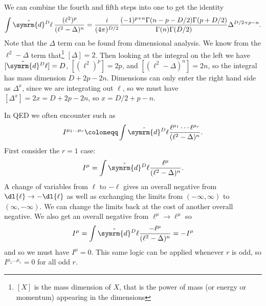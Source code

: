 \documentclass[fleqn]{NotesClass}
\newcommand{\dhat}[1]{\hat{\symrm{d}}{#1}}
\begin{document}
    We can combine the fourth and fifth steps into one to get the identity
    \begin{equation*}
        \int \dhat{^D\ell} \, \frac{(\ell^2)^p}{(\ell^2 - \Delta)^n} = \frac{i}{(4\pi)^{D/2}} \frac{(-1)^{p + n} \Gamma(n - p - D/2)\Gamma(p + D/2)}{\Gamma(n)\Gamma(D/2)} \Delta^{D/2 + p - n}.
    \end{equation*}
    Note that the \(\Delta\) term can be found from dimensional analysis.
    We know from the \(\ell^2 - \Delta\) term that\footnote{\([X]\) is the mass dimension of \(X\), that is the power of mass (or energy or momentum) appearing in the dimensions} \([\Delta] = 2\).
    Then looking at the integral on the left we have \([\dhat{^D\ell}] = D\), \([(\ell^2)^p] = 2p\), and \([(\ell^2 - \Delta)^n] = 2n\), so the integral has mass dimension \(D + 2p - 2n\).
    Dimensions can only enter the right hand side as \(\Delta^x\), since we are integrating out \(\ell\), so we must have \([\Delta^x] = 2x = D + 2p - 2n\), so \(x = D/2 + p - n\).
    
    In QED we often encounter  such as
    \begin{equation}
        I^{\mu_1 \dotso \mu_r} \coloneqq \int \dhat{^D\ell} \frac{\ell^{\mu_1} \dotsm \ell^{\mu_r}}{(\ell^2 - \Delta)^n}.
    \end{equation}
    First consider the \(r = 1\) case:
    \begin{equation}
        I^\mu = \int \dhat{^D\ell} \frac{\ell^\mu}{(\ell^2 - \Delta)^n}.
    \end{equation}
    A change of variables from \(\ell\) to \(-\ell\) gives an overall negative from \(\dl{\ell} \to -\dl{\ell}\) as well as exchanging the limits from \((-\infty, \infty)\) to \((\infty, -\infty)\).
    We can change the limits back at the cost of another overall negative.
    We also get an overall negative from \(\ell^\mu \to \ell^\mu\) so
    \begin{equation}
        I^\mu = \int \dhat{^D\ell} \frac{-\ell^\mu}{(\ell^2 - \Delta)^n} = -I^\mu
    \end{equation}
    and so we must have \(I^\mu = 0\).
    This same logic can be applied whenever \(r\) is odd, so \(I^{\mu_1 \dotso \mu_r} = 0\) for all odd \(r\).
    
\end{document}
